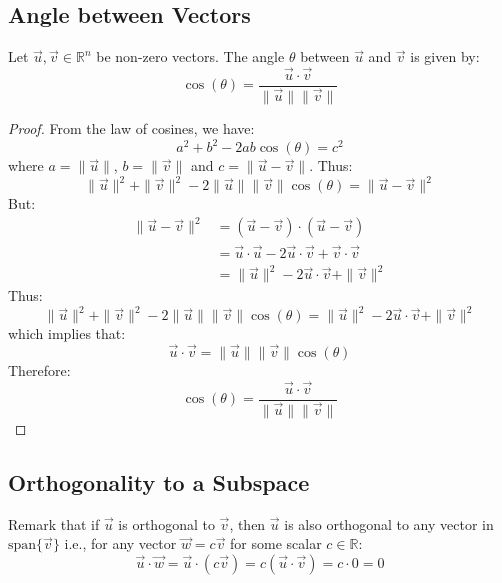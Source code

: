 \subsection{Angle between Vectors}
\begin{theorem}
    Let $\vec{u}, \vec{v} \in \mathbb{R}^n$ be non-zero vectors. The angle $\theta$ between $\vec{u}$ and $\vec{v}$ is given by:
    \[
        \cos(\theta) = \frac{\vec{u} \cdot \vec{v}}{\|\vec{u}\| \|\vec{v}\|}
    \]
\end{theorem}
\begin{proof}
    From the law of cosines, we have:
    \[
        a^2 + b^2 - 2ab \cos(\theta) = c^2
    \]
    where $a = \|\vec{u}\|$, $b = \|\vec{v}\|$ and $c = \|\vec{u} - \vec{v}\|$. Thus:
    \[
        \|\vec{u}\|^2 + \|\vec{v}\|^2 - 2 \|\vec{u}\| \|\vec{v}\| \cos(\theta) = \|\vec{u} - \vec{v}\|^2
    \]
    But:
    \begin{align*}
        \|\vec{u} - \vec{v}\|^2 &= (\vec{u} - \vec{v}) \cdot (\vec{u} - \vec{v}) \\
        &= \vec{u} \cdot \vec{u} - 2 \vec{u} \cdot \vec{v} + \vec{v} \cdot \vec{v} \\
        &= \|\vec{u}\|^2 - 2 \vec{u} \cdot \vec{v} + \|\vec{v}\|^2
    \end{align*}
    Thus:
    \[
        \|\vec{u}\|^2 + \|\vec{v}\|^2 - 2 \|\vec{u}\| \|\vec{v}\| \cos(\theta) = \|\vec{u}\|^2 - 2 \vec{u} \cdot \vec{v} + \|\vec{v}\|^2
    \]
    which implies that:
    \[
        \vec{u} \cdot \vec{v} = \|\vec{u}\| \|\vec{v}\| \cos(\theta)
    \]
    Therefore:
    \[
        \cos(\theta) = \frac{\vec{u} \cdot \vec{v}}{\|\vec{u}\| \|\vec{v}\|}
    \]
\end{proof}

\subsection{Orthogonality to a Subspace}
Remark that if $\vec{u}$ is orthogonal to $\vec{v}$, then $\vec{u}$ is also orthogonal to any vector in $\text{span}\{\vec{v}\}$ i.e., for any vector $\vec{w} = c \vec{v}$ for some scalar $c \in \mathbb{R}$:
\[
    \vec{u} \cdot \vec{w} = \vec{u} \cdot (c \vec{v}) = c (\vec{u} \cdot \vec{v}) = c \cdot 0 = 0
\]

